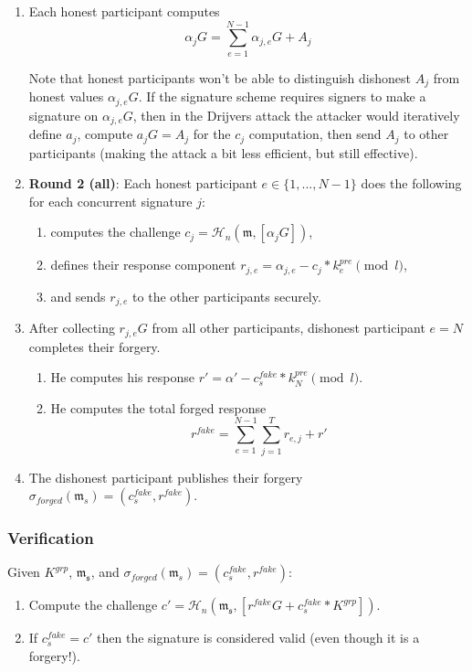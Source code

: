 \begin{enumerate}
    \item Each honest participant computes
    \[ \alpha_j G = \sum^{N-1}_{e=1} \alpha_{j,e} G + A_j \]
    
    Note that honest participants won't be able to distinguish dishonest $A_j$ from honest values $\alpha_{j,e} G$. If the signature scheme requires signers to make a signature on $\alpha_{j,e} G$, then in the Drijvers attack the attacker would iteratively define $a_j$, compute $a_j G = A_j$ for the $c_j$ computation, then send $A_j$ to other participants (making the attack a bit less efficient, but still effective).

    \item \textbf{Round 2 (all)}: Each honest participant $e \in \{1,...,N-1\}$ does the following for each concurrent signature $j$:
    \begin{enumerate}
        \item computes the challenge $c_j = \mathcal{H}_n(\mathfrak{m},[\alpha_j G])$,
        \item defines their response component $r_{j,e} = \alpha_{j,e} - c_j*k^{pre}_e \pmod l$,
        \item and sends $r_{j,e}$ to the other participants securely.
    \end{enumerate}

    \item After collecting $r_{j,e} G$ from all other participants, dishonest participant $e = N$ completes their forgery.
    \begin{enumerate}
        \item He computes his response $r' = \alpha' - c^{fake}_{s}*k^{pre}_N \pmod l$.
        \item He computes the total forged response
        \[ r^{fake} = \sum^{N-1}_{e=1} \sum^T_{j=1} r_{e,j} + r'\]
    \end{enumerate}

    \item The dishonest participant publishes their forgery $\sigma_{forged}(\mathfrak{m}_s) = (c^{fake}_s, r^{fake})$.
\end{enumerate}

\subsubsection*{Verification}

Given $K^{grp}$, $\mathfrak{m_s}$, and $\sigma_{forged}(\mathfrak{m}_s) = (c^{fake}_s, r^{fake})$:
\begin{enumerate}
    \item Compute the challenge $c' = \mathcal{H}_n(\mathfrak{m_s},[r^{fake} G + c^{fake}_s*K^{grp}])$.

    \item If $c^{fake}_s = c'$ then the signature is considered valid (even though it is a forgery!).
\end{enumerate}


